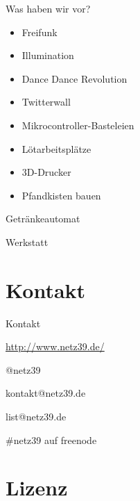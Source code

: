 \documentclass[hyperref={pdfpagelabels=false}]{beamer}
\begin{document}
\begin{frame}{Was haben wir vor?}
    \begin{itemize}
        \item Freifunk
        \item Illumination
        \item Dance Dance Revolution
        \item Twitterwall
        \item Mikrocontroller-Basteleien
        \item Lötarbeitsplätze
        \item 3D-Drucker
        \item Pfandkisten bauen
    \end{itemize}
\end{frame}

\begin{frame}{Getränkeautomat}
    \begin{figure}
    \end{figure}
\end{frame}

\begin{frame}{Werkstatt}
    \begin{figure}
    \end{figure}
\end{frame}

\section{Kontakt}

\begin{frame}{Kontakt}
    \begin{center}
        \begin{description}
            \item[WWW] \url{http://www.netz39.de/}
            \item[Twitter/identi.ca] @netz39
            \item[E-Mail] kontakt@netz39.de
            \item[Mailingliste] list@netz39.de
            \item[IRC] \#netz39 auf freenode
        \end{description}
    \end{center}
\end{frame}

\appendix

\section{Lizenz}
\end{document}

